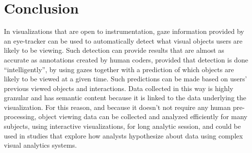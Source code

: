 \section{Conclusion}
In visualizations that are open to instrumentation, gaze information provided by an eye-tracker can be used to automatically detect what visual objects users are likely to be viewing. Such detection can provide results that are almost as accurate as annotations created by human coders, provided that detection is done ``intelligently'', by using gazes together with a prediction of which objects are likely to be viewed at a given time. Such predictions can be made based on users' previous viewed objects and interactions. Data collected in this way is highly granular and has semantic content because it is linked to the data underlying the visualization. For this reason, and because it doesn't not require any human pre-processing, object viewing data can be collected and analyzed efficiently for many subjects, using interactive visualizations, for long analytic session, and could be used in studies that explore how analysts hypothesize about data using complex visual analytics systems.    